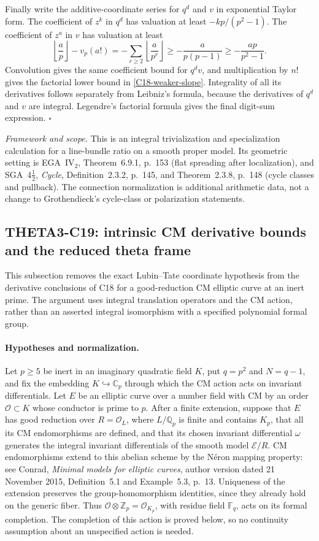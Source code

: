 \documentclass[11pt]{article}
\newcommand{\Q}{\mathbb Q}\newcommand{\C}{\mathbb C}\newcommand{\Z}{\mathbb Z}\newcommand{\R}{\mathbb R}\newcommand{\A}{\mathbb A}\newcommand{\OO}{\mathcal O}
\newcommand{\framework}[1]{\par\smallskip\noindent\textit{Framework and scope.} #1\par}
\theoremstyle{definition}\newtheorem{definition}[theorem]{Definition}\newtheorem{remark}[theorem]{Remark}
\begin{document}
Finally write the additive-coordinate series for $q^d$ and $v$ in
exponential Taylor form.  The coefficient of $z^k$ in $q^d$ has
valuation at least $-kp/(p^2-1)$.  The coefficient of $z^a$ in $v$
has valuation at least
\[
 \left\lfloor\frac ap\right\rfloor-v_p(a!)
  =-\sum_{r\geq2}\left\lfloor\frac a{p^r}\right\rfloor
  \geq-\frac{a}{p(p-1)}
  \geq-\frac{ap}{p^2-1}.
\]
Convolution gives the same coefficient bound for $q^dv$, and
multiplication by $n!$ gives the factorial lower bound in
\eqref{C18-weaker-slope}.  Integrality of all its derivatives follows
separately from Leibniz's formula, because the derivatives of $q^d$
and $v$ are integral.  Legendre's factorial formula gives the final
digit-sum expression. \hfill$\square$

\framework{This is an integral trivialization and specialization
calculation for a line-bundle ratio on a smooth proper model.
Its geometric setting is EGA~IV$_2$, Theorem~6.9.1, p.~153
(flat spreading after localization), and SGA~4$\frac12$,
\emph{Cycle}, Definition~2.3.2, p.~145, and Theorem~2.3.8,
p.~148 (cycle classes and pullback). The connection normalization
is additional arithmetic data, not a change to Grothendieck's
cycle-class or polarization statements.}


\subsection{THETA3-C19: intrinsic CM derivative bounds and the reduced theta frame}\label{C19}

This subsection removes the exact Lubin--Tate coordinate hypothesis
from the derivative conclusions of C18 for a good-reduction CM
elliptic curve at an inert prime.  The argument uses integral
translation operators and the CM action, rather than an asserted
integral isomorphism with a specified polynomial formal group.

\paragraph{Hypotheses and normalization.}
Let $p\geq5$ be inert in an imaginary quadratic field $K$, put
$q=p^2$ and $N=q-1$, and fix the embedding $K\hookrightarrow\C_p$
through which the CM action acts on invariant differentials.
Let $E$ be an elliptic curve over a number field with CM by an order
$\mathcal O\subset K$ whose conductor is prime to $p$.
After a finite extension, suppose that $E$ has good reduction over
$R=\mathcal O_L$, where $L/\Q_p$ is finite and contains $K_p$,
that all its CM endomorphisms are defined, and that its chosen
invariant differential $\omega$ generates the integral invariant
differentials of the smooth model $\mathcal E/R$.
CM endomorphisms extend to this abelian scheme by the N\'eron
mapping property: see Conrad, \emph{Minimal models for elliptic
curves}, author version dated 21 November 2015,
Definition~5.1 and Example~5.3, p.~13.
Uniqueness of the extension preserves the group-homomorphism
identities, since they already hold on the generic fiber.  Thus
$\mathcal O\otimes\Z_p=\mathcal O_{K_p}$, with residue field
$\mathbb F_q$, acts on its formal completion.
The completion of this action is proved below, so no continuity
assumption about an unspecified action is needed.
\end{document}

